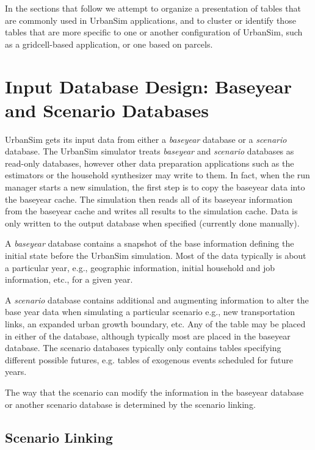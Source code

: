 In the sections that follow we attempt to organize a presentation of tables that are commonly used in UrbanSim
applications, and to cluster or identify those tables that are more specific to one or another configuration of
UrbanSim, such as a gridcell-based application, or one based on parcels.

\section{Input Database Design: Baseyear and Scenario Databases}
\label{urbansim-database-tables-baseyear-scenario-db}

UrbanSim gets its input data from either a \emph{baseyear} database or a
\emph{scenario} database.  The UrbanSim simulator treats \emph{baseyear} and
\emph{scenario} databases as read-only databases, however other data
preparation applications such as the estimators or the household synthesizer
may write to them.  In fact, when the run manager starts a new simulation, the
first step is to copy the baseyear data into the baseyear cache. The
simulation then reads all of its baseyear information from the baseyear cache
and writes all results to the simulation cache.  Data is only written to the
output database when specified (currently done manually).

A \emph{baseyear} database contains a snapshot of the base
information defining the initial state before the UrbanSim
simulation. Most of the data typically is about a particular year,
e.g., geographic information, initial household and job information,
etc., for a given year.

A \emph{scenario} database contains additional and augmenting information to
alter the base year data when simulating a particular scenario e.g., new
transportation links, an expanded urban growth boundary, etc. Any of the table
may be placed in either of the database, although typically most are placed in
the baseyear database.  The scenario databases typically only contains tables
specifying different possible futures, e.g. tables of exogenous events
scheduled for future years.

The way that the scenario can modify the information in the baseyear database or
another scenario database is determined by the scenario linking.

\subsection{Scenario Linking}


